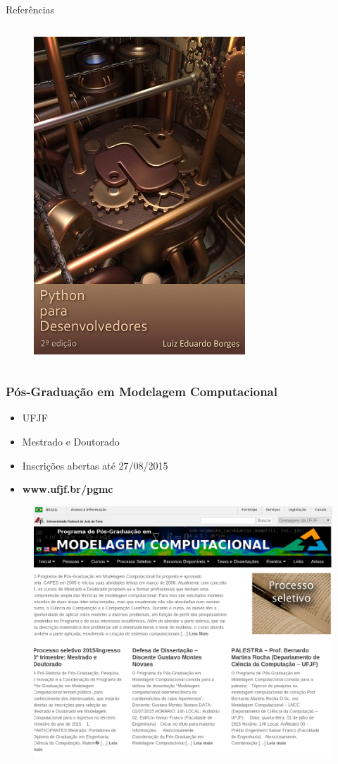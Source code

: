 \documentclass[12pt,t,graphics]{beamer}
\newcommand{\bi}{\begin{itemize}}
\newcommand{\ei}{\end{itemize}}
\begin{document}
\begin{frame}[t]{Referências}
\begin{columns}
\begin{figure}
			\includegraphics[scale=0.25]{img/pypd.jpg}
		\end{figure}
	\end{columns}
\end{frame}


\begin{frame}
  \frametitle{Pós-Graduação em Modelagem Computacional}
  \begin{center}
  \bi
  \item UFJF
  \item Mestrado e Doutorado
  \item Inscrições abertas até 27/08/2015
  \item \textbf{www.ufjf.br/pgmc}
  \ei
  \begin{figure}
    \centering
    \includegraphics[scale=0.15]{img/pgmc.png}
  \end{figure}
  \end{center}
\end{frame}
\end{document}
